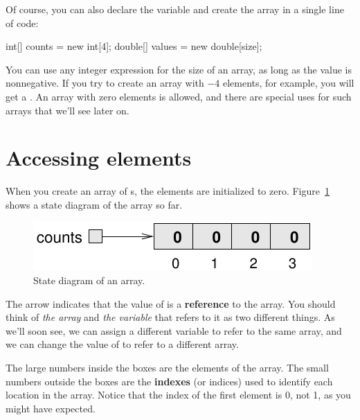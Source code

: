 Of course, you can also declare the variable and create the array in a single line of code:

\begin{code}
int[] counts = new int[4];
double[] values = new double[size];
\end{code}


You can use any integer expression for the size of an array, as long as the value is nonnegative.
If you try to create an array with $-4$ elements, for example, you will get a .
An array with zero elements is allowed, and there are special uses for such arrays that we'll see later on.


\section{Accessing elements}
\label{elements}


When you create an array of s, the elements are initialized to zero.
Figure~\ref{fig.array} shows a state diagram of the  array so far.

\begin{figure}[!ht]
\begin{center}
\includegraphics{figs/array.pdf}
\caption{State diagram of an  array.}
\label{fig.array}
\end{center}
\end{figure}


The arrow indicates that the value of  is a {\bf reference} to the array.
You should think of {\em the array} and {\em the variable} that refers to it as two different things.
As we'll soon see, we can assign a different variable to refer to the same array, and we can change the value of  to refer to a different array.


The large numbers inside the boxes are the elements of the array.
The small numbers outside the boxes are the {\bf indexes} (or indices) used to identify each location in the array.
Notice that the index of the first element is 0, not 1, as you might have expected.

